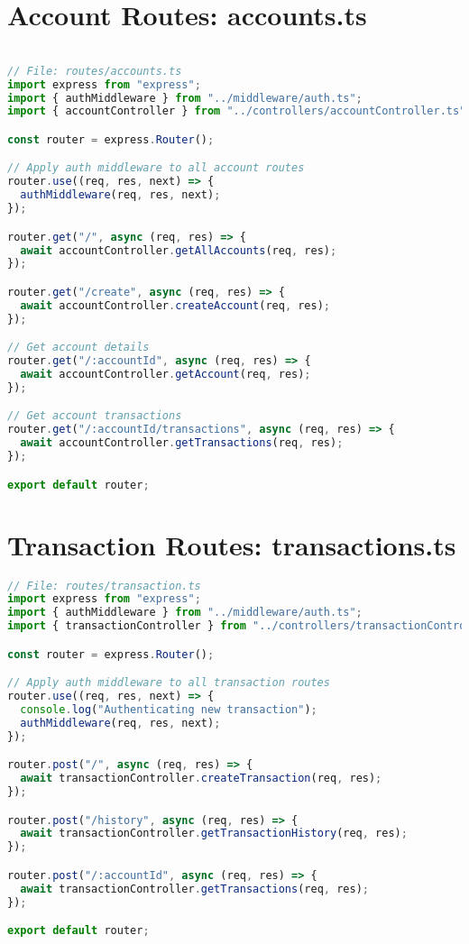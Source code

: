 \section{Account Routes: accounts.ts}
\begin{lstlisting}[language=TypeScript]

// File: routes/accounts.ts
import express from "express";
import { authMiddleware } from "../middleware/auth.ts";
import { accountController } from "../controllers/accountController.ts";

const router = express.Router();

// Apply auth middleware to all account routes
router.use((req, res, next) => {
  authMiddleware(req, res, next);
});

router.get("/", async (req, res) => {
  await accountController.getAllAccounts(req, res);
});

router.get("/create", async (req, res) => {
  await accountController.createAccount(req, res);
});

// Get account details
router.get("/:accountId", async (req, res) => {
  await accountController.getAccount(req, res);
});

// Get account transactions
router.get("/:accountId/transactions", async (req, res) => {
  await accountController.getTransactions(req, res);
});

export default router;
\end{lstlisting}

\section{Transaction Routes: transactions.ts}
\begin{lstlisting}[language=TypeScript]
// File: routes/transaction.ts
import express from "express";
import { authMiddleware } from "../middleware/auth.ts";
import { transactionController } from "../controllers/transactionController.ts";

const router = express.Router();

// Apply auth middleware to all transaction routes
router.use((req, res, next) => {
  console.log("Authenticating new transaction");
  authMiddleware(req, res, next);
});

router.post("/", async (req, res) => {
  await transactionController.createTransaction(req, res);
});

router.post("/history", async (req, res) => {
  await transactionController.getTransactionHistory(req, res);
});

router.post("/:accountId", async (req, res) => {
  await transactionController.getTransactions(req, res);
});

export default router;
\end{lstlisting}

